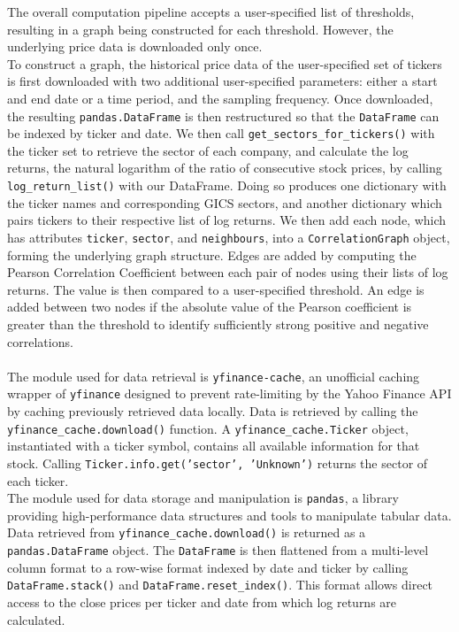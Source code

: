 \documentclass[fontsize=11pt]{article}
\begin{document}
The overall computation pipeline accepts a user-specified list of thresholds, resulting in a graph being constructed for each threshold. However, the underlying price data is downloaded only once.\\
To construct a graph, the historical price data of the user-specified set of tickers is first downloaded with two additional user-specified parameters: either a start and end date or a time period, and the sampling frequency. Once downloaded, the resulting \texttt{pandas.DataFrame} is then restructured so that the \texttt{DataFrame} can be indexed by ticker and date. We then call \texttt{get\_sectors\_for\_tickers()} with the ticker set to retrieve the sector of each company, and calculate the log returns, the natural logarithm of the ratio of consecutive stock prices, by calling \texttt{log\_return\_list()} with our DataFrame. Doing so produces one dictionary with the ticker names and corresponding GICS sectors, and another dictionary which pairs tickers to their respective list of log returns. We then add each node, which has attributes \texttt{ticker}, \texttt{sector}, and \texttt{neighbours}, into a \texttt{CorrelationGraph} object, forming the underlying graph structure. Edges are added by computing the Pearson Correlation Coefficient between each pair of nodes using their lists of log returns. The value is then compared to a user-specified threshold. An edge is added between two nodes if the absolute value of the Pearson coefficient is greater than the threshold to identify sufficiently strong positive and negative correlations.\\\\

The module used for data retrieval is \texttt{yfinance-cache}, an unofficial caching wrapper of \texttt{yfinance} designed to prevent rate-limiting by the Yahoo Finance API by caching previously retrieved data locally. Data is retrieved by calling the \texttt{yfinance\_cache.download()} function. A \texttt{yfinance\_cache.Ticker} object, instantiated with a ticker symbol, contains all available information for that stock. Calling \texttt{Ticker.info.get('sector', 'Unknown')} returns the sector of each ticker.\\
The module used for data storage and manipulation is \texttt{pandas}, a library providing high-performance data structures and tools to manipulate tabular data. Data retrieved from  \texttt{yfinance\_cache.download()} is returned as a \texttt{pandas.DataFrame} object. The \texttt{DataFrame} is then flattened from a multi-level column format to a row-wise format indexed by date and ticker by calling \texttt{DataFrame.stack()} and \texttt{DataFrame.reset\_index()}. This format allows direct access to the close prices per ticker and date from which log returns are calculated.
\end{document}
